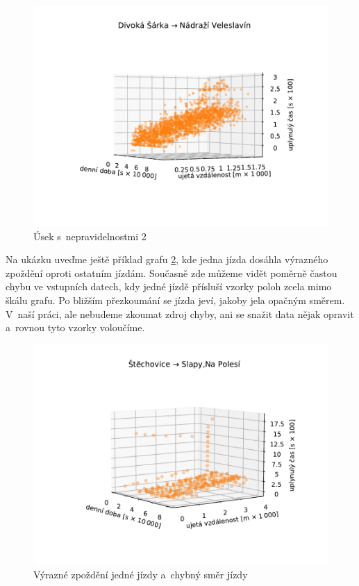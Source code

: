 \begin{figure}
\centering
  \includegraphics[width=\linewidth]{../img/164_165}
  \caption{Úsek s~nepravidelnostmi 2}
  \label{fig:divoka_sarka_veleslavin}
\end{figure}

\bigbreak


Na ukázku uveďme ještě příklad grafu \ref{fig:delayed_trip}, kde jedna jízda dosáhla výrazného zpoždění oproti ostatním jízdám. Současně zde můžeme vidět poměrně častou chybu ve vstupních datech, kdy jedné jízdě přísluší vzorky poloh zcela mimo škálu grafu. Po bližším přezkoumání se jízda jeví, jakoby jela opačným směrem. V~naší práci, ale nebudeme zkoumat zdroj chyby, ani se snažit data nějak opravit a~rovnou tyto vzorky voloučíme.


\begin{figure}
\centering
  \includegraphics[width=\linewidth]{../img/16_17}
  \caption{Výrazné zpoždění jedné jízdy a~chybný směr jízdy}
  \label{fig:delayed_trip}
\end{figure}


